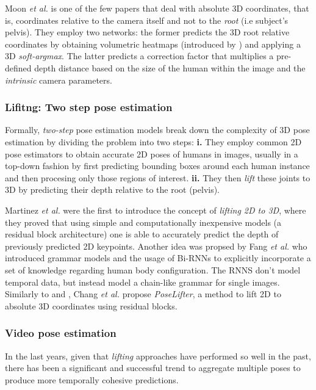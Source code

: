 \documentclass[letterpaper]{article}
\begin{document}
Moon \textit{et al.} \cite{moon19} is one of the few papers that deal with absolute 3D coordinates, that is, coordinates relative to the camera itself and not to the \textit{root} (i.e subject's pelvis). They employ two networks: the former predicts the 3D root relative coordinates by obtaining volumetric heatmaps (introduced by \cite{pavlakos17}) and applying a 3D \textit{soft-argmax}. The latter predicts a correction factor that multiplies a pre-defined depth distance based on the size of the human within the image and the \textit{intrinsic} camera parameters. 

\subsubsection{Lifitng: Two step pose estimation}
Formally, \textit{two-step} pose estimation models break down the complexity of 3D pose estimation by dividing the problem into two steps: \textbf{i.} They employ common 2D pose estimators to obtain accurate 2D poses of humans in images, usually in a top-down fashion by first predicting bounding boxes around each human instance and then procesing only those regions of interest. \textbf{ii.} They then \textit{lift} these joints to 3D by predicting their depth relative to the root (pelvis).

Martinez \textit{et al.} \cite{martinez17} were the first to introduce the concept of \textit{lifting 2D to 3D}, where they proved that using simple and computationally inexpensive models (a residual block architecture) one is able to accurately predict the depth of previously predicted 2D keypoints. Another idea was propsed by Fang \textit{et al.} \cite{fang18} who introduced grammar models and the usage of Bi-RNNs to explicitly incorporate a set of knowledge regarding human body configuration. The RNNS don't model temporal data, but instead model a chain-like grammar for single images. Similarly to \cite{moon19} and \cite{martinez17}, Chang \textit{et al.} \cite{chang20} propose \textit{PoseLifter}, a method to lift 2D to absolute 3D coordinates using residual blocks.
\\
\subsubsection{Video pose estimation}
In the last years, given that \textit{lifting} approaches have performed so well in the past, there has been a significant and successful trend to aggregate multiple poses to produce more temporally cohesive predictions. 
\end{document}
